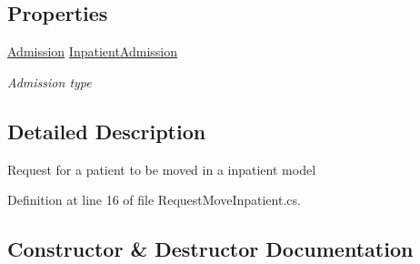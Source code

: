 \subsection*{Properties}
\begin{DoxyCompactItemize}
\item 
\hyperlink{class_general_health_care_elements_1_1_treatment_admission_types_1_1_admission}{Admission} \hyperlink{class_general_health_care_elements_1_1_management_1_1_request_move_inpatient_a479df0ab083ed4a44289c333de8d35e0}{Inpatient\+Admission}
\begin{DoxyCompactList}\small\item\em Admission type \end{DoxyCompactList}\end{DoxyCompactItemize}


\subsection{Detailed Description}
Request for a patient to be moved in a inpatient model 



Definition at line 16 of file Request\+Move\+Inpatient.\+cs.



\subsection{Constructor \& Destructor Documentation}
